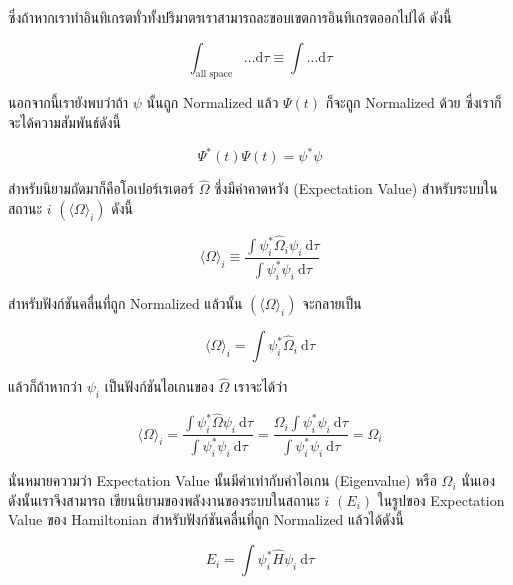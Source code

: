 \noindent ซึ่งถ้าหากเราทำอินทิเกรตทั่วทั้งปริมาตรเราสามารถละขอบเขตการอินทิเกรตออกไปได้ ดังนี้

\begin{equation}
  \int_{\text{all space}} \ldots \mathrm{d} \tau \equiv \int \ldots \mathrm{d} \tau
\end{equation}

นอกจากนี้เรายังพบว่าถ้า $\psi$ นั้นถูก Normalized แล้ว $\Psi(t)$ ก็จะถูก Normalized ด้วย ซึ่งเราก็จะได้ความสัมพันธ์ดังนี้

\begin{equation}
  \Psi^*(t) \Psi(t) = \psi^* \psi
\end{equation}

สำหรับนิยามถัดมาก็คือโอเปอร์เรเตอร์ $\hat{\Omega}$ ซึ่งมีค่าคาดหวัง (Expectation Value) สำหรับระบบในสถานะ $i$
$(\langle\Omega\rangle_i)$ ดังนี้

\begin{equation}
  \langle\Omega\rangle_i
  \equiv
  \frac
  {
    \int \psi_i^* \hat{\Omega}_i \psi_i \mathrm{~d} \tau
  }
  {
    \int \psi_i^* \psi_i \mathrm{~d} \tau
  }
\end{equation}

\noindent สำหรับฟังก์ชันคลื่นที่ถูก Normalized แล้วนั้น $(\langle\Omega\rangle_i)$ จะกลายเป็น

\begin{equation}
  \langle\Omega\rangle_i = \int \psi_i^* \hat{\Omega}_i \mathrm{~d} \tau
\end{equation}

แล้วก็ถ้าหากว่า $\psi_i$ เป็นฟังก์ชันไอเกนของ $\hat{\Omega}$ เราจะได้ว่า

\begin{equation}
  \langle\Omega\rangle_i
  = \frac
  {
    \int \psi_i^* \hat{\Omega} \psi_i \mathrm{~d} \tau
  }
  {
    \int \psi_i^* \psi_i \mathrm{~d} \tau
  }
  = \frac
  {
    \Omega_i \int \psi_i^* \psi_i \mathrm{~d} \tau
  }
  {
    \int \psi_i^* \psi_i \mathrm{~d} \tau
  }
  = \Omega_i
\end{equation}

\noindent นั่นหมายความว่า Expectation Value นั้นมีค่าเท่ากับค่าไอเกน (Eigenvalue) หรือ $\Omega_i$ นั่นเอง ดังนั้นเราจึงสามารถ%
เขียนนิยามของพลังงานของระบบในสถานะ $i$ $(E_i)$ ในรูปของ Expectation Value ของ Hamiltonian สำหรับฟังก์ชันคลื่นที่ถูก
Normalized แล้วได้ดังนี้

\begin{equation}
  E_i = \int \psi_i^* \hat{H} \psi_i \mathrm{~d} \tau
\end{equation}


